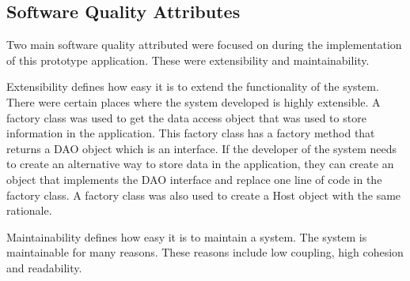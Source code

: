 \tocless\subsection{Software Quality Attributes}
Two main software quality attributed were focused on during the implementation of this prototype application. These were extensibility and maintainability.

Extensibility defines how easy it is to extend the functionality of the system.
There were certain places where the system developed is highly extensible.
A factory class was used to get the data access object that was used to store information in the application.
This factory class has a factory method that returns a DAO object which is an interface.
If the developer of the system needs to create an alternative way to store data in the application, they can create an object that implements the DAO interface and replace one line of code in the factory class.
A factory class was also used to create a Host object with the same rationale.

Maintainability defines how easy it is to maintain a system.
The system is maintainable for many reasons.
These reasons include low coupling, high cohesion and readability.




